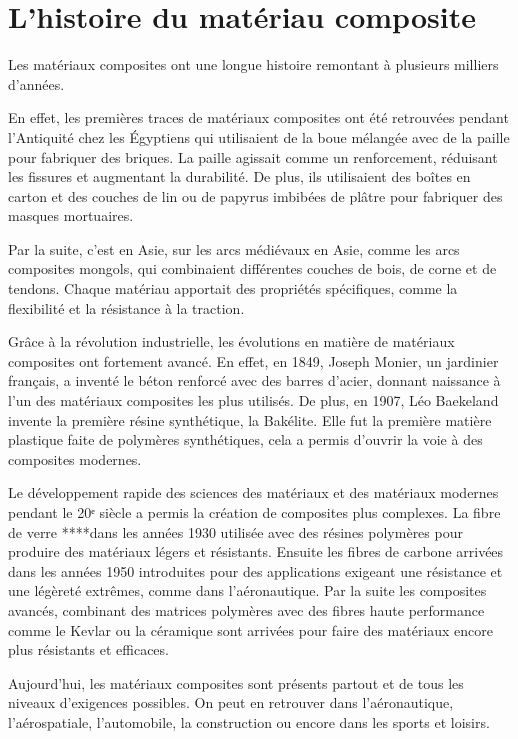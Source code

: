 \section{L’histoire du matériau composite}

\indent Les matériaux composites ont une longue histoire remontant à plusieurs milliers d’années. \cite{zhendi}

\vspace{10pt}
En effet, les premières traces de matériaux composites ont été retrouvées pendant l’Antiquité chez les Égyptiens qui utilisaient de la boue mélangée avec de la paille pour fabriquer des briques.
La paille agissait comme un renforcement, réduisant les fissures et augmentant la durabilité.
De plus, ils utilisaient des boîtes en carton et des couches de lin ou de papyrus imbibées de plâtre pour fabriquer des masques mortuaires.


Par la suite, c’est en Asie, sur les arcs médiévaux en Asie, comme les arcs composites mongols, qui combinaient différentes couches de bois, de corne et de tendons.
Chaque matériau apportait des propriétés spécifiques, comme la flexibilité et la résistance à la traction.


Grâce à la révolution industrielle, les évolutions en matière de matériaux composites ont fortement avancé.
En effet, en 1849, Joseph Monier, un jardinier français, a inventé le béton renforcé avec des barres d'acier, donnant naissance à l'un des matériaux composites les plus utilisés.
De plus, en 1907, Léo Baekeland invente la première résine synthétique, la Bakélite.
Elle fut la première matière plastique faite de polymères synthétiques, cela a permis d’ouvrir la voie à des composites modernes.

\vspace{10pt}
Le développement rapide des sciences des matériaux et des matériaux modernes pendant le 20ᵉ siècle a permis la création de composites plus complexes.
La fibre de verre ****dans les années 1930 utilisée avec des résines polymères pour produire des matériaux légers et résistants.
Ensuite les fibres de carbone arrivées dans les années 1950 introduites pour des applications exigeant une résistance et une légèreté extrêmes, comme dans l’aéronautique.
Par la suite les composites avancés, combinant des matrices polymères avec des fibres haute performance comme le Kevlar ou la céramique sont arrivées pour faire des matériaux encore plus résistants et efficaces.


Aujourd’hui, les matériaux composites sont présents partout et de tous les niveaux d’exigences possibles.
On peut en retrouver dans l’aéronautique, l’aérospatiale, l’automobile, la construction ou encore dans les sports et loisirs.

